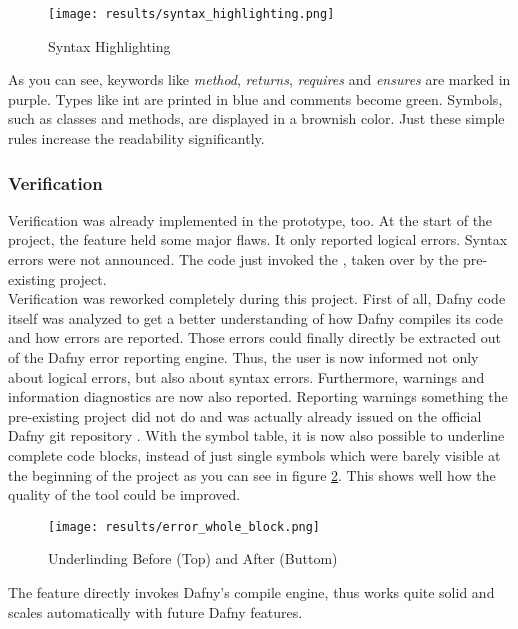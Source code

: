 \begin{figure}[H]
    \centering
    \texttt{[image: results/syntax\_highlighting.png]}
    \caption{Syntax Highlighting}
    \label{fig:result_syntax_highlight}
\end{figure}

As you can see, keywords like \textit{method}, \textit{returns}, \textit{requires} and \textit{ensures} are marked in purple.
Types like int are printed in blue and comments become green.
Symbols, such as classes and methods, are displayed in a brownish color.
Just these simple rules increase the readability significantly.

\subsubsection{Verification}
Verification was already implemented in the prototype, too.
At the start of the project, the feature held some major flaws.
It only reported logical errors.
Syntax errors were not announced.
The code just invoked the , taken over by the pre-existing project.\\

Verification was reworked completely during this project.
First of all, Dafny code itself was analyzed to get a better understanding of how Dafny compiles its code and how errors are reported.
Those errors could finally directly be extracted out of the Dafny error reporting engine.
Thus, the user is now informed not only about logical errors, but also about syntax errors.
Furthermore, warnings and information diagnostics are now also reported.
Reporting warnings something the pre-existing project did not do and was actually already issued on the official Dafny git repository \cite{dafny_noWarnings}.
With the symbol table, it is now also possible to underline complete code blocks, instead of just single symbols which were barely visible at the beginning of the project as you can see in figure \ref{fig:error_whole_block}.
This shows well how the quality of the tool could be improved.

\begin{figure}[H]
    \centering
    \texttt{[image: results/error\_whole\_block.png]}
    \caption{Underlinding Before (Top) and After (Buttom)}
    \label{fig:error_whole_block}
\end{figure}

The feature directly invokes Dafny's compile engine, thus works quite solid and scales automatically with future Dafny features.


